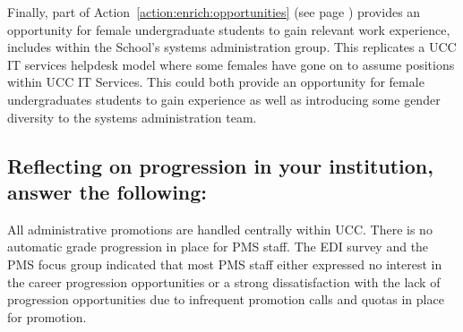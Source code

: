 Finally, part of Action~\ref{action:enrich:opportunities} %
(see page \pageref{action:enrich:opportunities}) provides an opportunity for female undergraduate students to gain relevant work experience, includes within the School's systems administration group. 
This replicates a UCC IT services helpdesk model where some females have gone on to assume positions within UCC IT Services. This could both provide an opportunity for female undergraduates students to gain experience as well as introducing some gender diversity to the systems administration team. %


\subsection{Reflecting on progression in your institution, answer the following:}

All administrative promotions are handled centrally within UCC. There is no automatic grade progression in place for PMS staff. 
The EDI survey and the PMS focus group indicated that most PMS staff either expressed no interest in the career progression opportunities or a strong dissatisfaction with the lack of progression opportunities due to infrequent promotion calls and quotas in place for promotion.  



